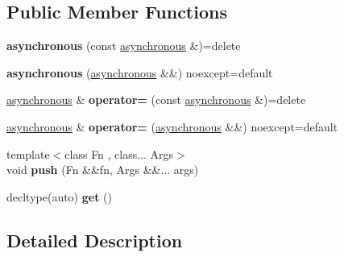 \subsection*{Public Member Functions}
\begin{DoxyCompactItemize}
\item 
\mbox{\label{classsequoia_1_1concurrency_1_1asynchronous_a6627a0bedf5bef8d807b997804dd8280}} 
{\bfseries asynchronous} (const \mbox{\hyperlink{classsequoia_1_1concurrency_1_1asynchronous}{asynchronous}} \&)=delete
\item 
\mbox{\label{classsequoia_1_1concurrency_1_1asynchronous_a7592571cc8d771a7e9564583b8f71f2a}} 
{\bfseries asynchronous} (\mbox{\hyperlink{classsequoia_1_1concurrency_1_1asynchronous}{asynchronous}} \&\&) noexcept=default
\item 
\mbox{\label{classsequoia_1_1concurrency_1_1asynchronous_a97822b955f61c29f613cf05d2365c95b}} 
\mbox{\hyperlink{classsequoia_1_1concurrency_1_1asynchronous}{asynchronous}} \& {\bfseries operator=} (const \mbox{\hyperlink{classsequoia_1_1concurrency_1_1asynchronous}{asynchronous}} \&)=delete
\item 
\mbox{\label{classsequoia_1_1concurrency_1_1asynchronous_a5b28aa5878aa05d52bee15f3ac146994}} 
\mbox{\hyperlink{classsequoia_1_1concurrency_1_1asynchronous}{asynchronous}} \& {\bfseries operator=} (\mbox{\hyperlink{classsequoia_1_1concurrency_1_1asynchronous}{asynchronous}} \&\&) noexcept=default
\item 
\mbox{\label{classsequoia_1_1concurrency_1_1asynchronous_a142ac18d26990590d7fe579b1bf6da85}} 
{\footnotesize template$<$class Fn , class... Args$>$ }\\void {\bfseries push} (Fn \&\&fn, Args \&\&... args)
\item 
\mbox{\label{classsequoia_1_1concurrency_1_1asynchronous_a8dfac0ddbe42e1df5f58052bad6bdb7d}} 
decltype(auto) {\bfseries get} ()
\end{DoxyCompactItemize}


\subsection{Detailed Description}

